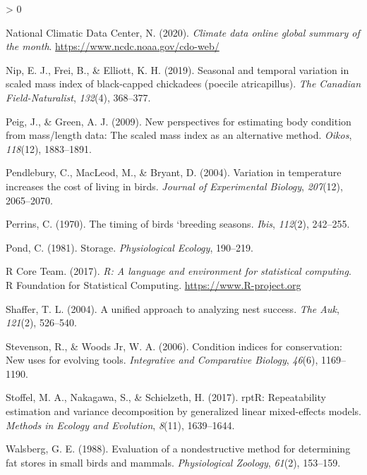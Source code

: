 \documentclass[
]{article}
\newlength{\cslhangindent}
\newenvironment{CSLReferences}[2] %
 {%
  \setlength{\parindent}{0pt}
  \ifodd #1 \everypar{\setlength{\hangindent}{\cslhangindent}}\ignorespaces\fi
  \ifnum #2 > 0
  \setlength{\parskip}{#2\baselineskip}
  \fi
 }%
 {}
\begin{document}
\begin{CSLReferences}{1}{0}
\leavevmode\hypertarget{ref-noaa2020climate}{}%
National Climatic Data Center, N. (2020). \emph{Climate data online
global summary of the month}. \url{https://www.ncdc.noaa.gov/cdo-web/}

\leavevmode\hypertarget{ref-nip2019seasonal}{}%
Nip, E. J., Frei, B., \& Elliott, K. H. (2019). Seasonal and temporal
variation in scaled mass index of black-capped chickadees (poecile
atricapillus). \emph{The Canadian Field-Naturalist}, \emph{132}(4),
368--377.

\leavevmode\hypertarget{ref-peig2009new}{}%
Peig, J., \& Green, A. J. (2009). New perspectives for estimating body
condition from mass/length data: The scaled mass index as an alternative
method. \emph{Oikos}, \emph{118}(12), 1883--1891.

\leavevmode\hypertarget{ref-pendlebury2004variation}{}%
Pendlebury, C., MacLeod, M., \& Bryant, D. (2004). Variation in
temperature increases the cost of living in birds. \emph{Journal of
Experimental Biology}, \emph{207}(12), 2065--2070.

\leavevmode\hypertarget{ref-perrins1970timing}{}%
Perrins, C. (1970). The timing of birds `breeding seasons. \emph{Ibis},
\emph{112}(2), 242--255.

\leavevmode\hypertarget{ref-pond1981storage}{}%
Pond, C. (1981). Storage. \emph{Physiological Ecology}, 190--219.

\leavevmode\hypertarget{ref-rcoreteam}{}%
R Core Team. (2017). \emph{R: A language and environment for statistical
computing}. R Foundation for Statistical Computing.
\url{https://www.R-project.org}

\leavevmode\hypertarget{ref-shaffer2004unified}{}%
Shaffer, T. L. (2004). A unified approach to analyzing nest success.
\emph{The Auk}, \emph{121}(2), 526--540.

\leavevmode\hypertarget{ref-stevenson2006condition}{}%
Stevenson, R., \& Woods Jr, W. A. (2006). Condition indices for
conservation: New uses for evolving tools. \emph{Integrative and
Comparative Biology}, \emph{46}(6), 1169--1190.

\leavevmode\hypertarget{ref-stoffel2017rptr}{}%
Stoffel, M. A., Nakagawa, S., \& Schielzeth, H. (2017). rptR:
Repeatability estimation and variance decomposition by generalized
linear mixed-effects models. \emph{Methods in Ecology and Evolution},
\emph{8}(11), 1639--1644.

\leavevmode\hypertarget{ref-walsberg1988evaluation}{}%
Walsberg, G. E. (1988). Evaluation of a nondestructive method for
determining fat stores in small birds and mammals. \emph{Physiological
Zoology}, \emph{61}(2), 153--159.


\end{CSLReferences}
\end{document}
